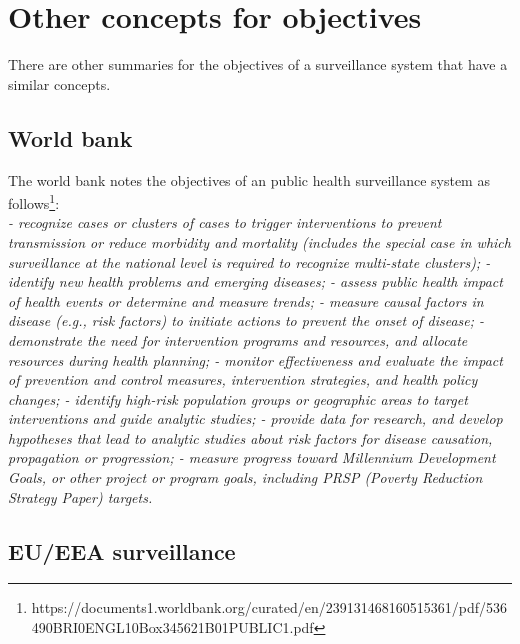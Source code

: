 \documentclass[
  letterpaper,
  DIV=11,
  numbers=noendperiod]{scrreprt}
\begin{document}
\section{Other concepts for
objectives}\label{other-concepts-for-objectives}

There are other summaries for the objectives of a surveillance system
that have a similar concepts.

\subsection{World bank}\label{world-bank}

The world bank notes the objectives of an public health surveillance
system as follows\footnote{https://documents1.worldbank.org/curated/en/239131468160515361/pdf/536490BRI0ENGL10Box345621B01PUBLIC1.pdf}:\\
\emph{- recognize cases or clusters of cases to trigger interventions to
prevent transmission or reduce morbidity and mortality (includes the
special case in which surveillance at the national level is required to
recognize multi-state clusters); - identify new health problems and
emerging diseases; - assess public health impact of health events or
determine and measure trends; - measure causal factors in disease (e.g.,
risk factors) to initiate actions to prevent the onset of disease; -
demonstrate the need for intervention programs and resources, and
allocate resources during health planning; - monitor effectiveness and
evaluate the impact of prevention and control measures, intervention
strategies, and health policy changes; - identify high-risk population
groups or geographic areas to target interventions and guide analytic
studies; - provide data for research, and develop hypotheses that lead
to analytic studies about risk factors for disease causation,
propagation or progression; - measure progress toward Millennium
Development Goals, or other project or program goals, including PRSP
(Poverty Reduction Strategy Paper) targets.}

\subsection{EU/EEA surveillance}\label{eueea-surveillance}
\end{document}
